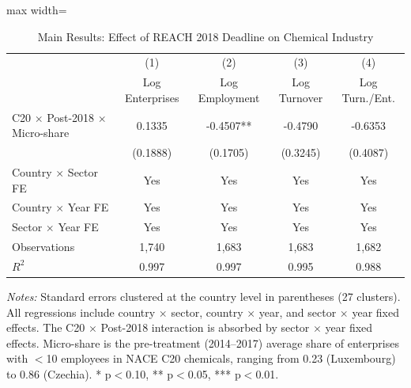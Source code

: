 \begin{table}[H]
\centering
\caption{Main Results: Effect of REACH 2018 Deadline on Chemical Industry}
\label{tab:main}

\begin{adjustbox}{max width=\textwidth}\begin{tabular}{l*{4}{c}}
\toprule
 & (1) & (2) & (3) & (4) \\
 & Log Enterprises & Log Employment & Log Turnover & Log Turn./Ent. \\
\midrule
C20 $\times$ Post-2018 $\times$ Micro-share & 0.1335 & -0.4507** & -0.4790 & -0.6353 \\
 & (0.1888) & (0.1705) & (0.3245) & (0.4087) \\
\midrule
Country $\times$ Sector FE & Yes & Yes & Yes & Yes \\
Country $\times$ Year FE & Yes & Yes & Yes & Yes \\
Sector $\times$ Year FE & Yes & Yes & Yes & Yes \\
Observations & 1,740 & 1,683 & 1,683 & 1,682 \\
$R^2$ & 0.997 & 0.997 & 0.995 & 0.988 \\
\bottomrule
\end{tabular}\end{adjustbox}
\par\vspace{0.3em}

\textit{Notes:} Standard errors clustered at the country level in parentheses (27 clusters). All regressions include country $\times$ sector, country $\times$ year, and sector $\times$ year fixed effects. The C20 $\times$ Post-2018 interaction is absorbed by sector $\times$ year fixed effects. Micro-share is the pre-treatment (2014--2017) average share of enterprises with $<$10 employees in NACE C20 chemicals, ranging from 0.23 (Luxembourg) to 0.86 (Czechia). * p$<$0.10, ** p$<$0.05, *** p$<$0.01.


\end{table}
